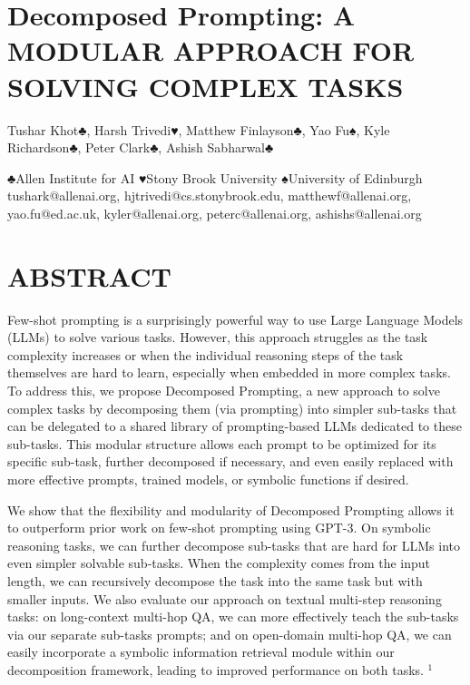 \documentclass[
]{article}
\author{}
\date{}
\begin{document}
\section{Decomposed Prompting: A MODULAR APPROACH FOR SOLVING COMPLEX
TASKS}\label{decomposed-prompting-a-modular-approach-for-solving-complex-tasks}

Tushar Khot♣, Harsh Trivedi♥, Matthew Finlayson♣, Yao Fu♠, Kyle
Richardson♣, Peter Clark♣, Ashish Sabharwal♣

♣Allen Institute for AI ♥Stony Brook University ♠University of Edinburgh
tushark@allenai.org, hjtrivedi@cs.stonybrook.edu, matthewf@allenai.org,
yao.fu@ed.ac.uk, kyler@allenai.org, peterc@allenai.org,
ashishs@allenai.org

\section{ABSTRACT}\label{abstract}

Few-shot prompting is a surprisingly powerful way to use Large Language
Models (LLMs) to solve various tasks. However, this approach struggles
as the task complexity increases or when the individual reasoning steps
of the task themselves are hard to learn, especially when embedded in
more complex tasks. To address this, we propose Decomposed Prompting, a
new approach to solve complex tasks by decomposing them (via prompting)
into simpler sub-tasks that can be delegated to a shared library of
prompting-based LLMs dedicated to these sub-tasks. This modular
structure allows each prompt to be optimized for its specific sub-task,
further decomposed if necessary, and even easily replaced with more
effective prompts, trained models, or symbolic functions if desired.

We show that the flexibility and modularity of Decomposed Prompting
allows it to outperform prior work on few-shot prompting using GPT-3. On
symbolic reasoning tasks, we can further decompose sub-tasks that are
hard for LLMs into even simpler solvable sub-tasks. When the complexity
comes from the input length, we can recursively decompose the task into
the same task but with smaller inputs. We also evaluate our approach on
textual multi-step reasoning tasks: on long-context multi-hop QA, we can
more effectively teach the sub-tasks via our separate sub-tasks prompts;
and on open-domain multi-hop QA, we can easily incorporate a symbolic
information retrieval module within our decomposition framework, leading
to improved performance on both tasks. \(^{1}\)
\end{document}
